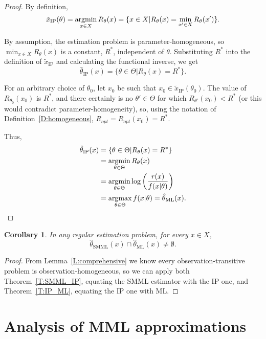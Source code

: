 \documentclass{IEEEtran}
\newcommand{\argmax}{\operatornamewithlimits{argmax}}
\newcommand{\argmin}{\operatornamewithlimits{argmin}}
\newtheorem{cor}{Corollary}[thm]
\begin{document}
\begin{proof}
By definition,
\[
\tilde{x}_{\text{IP}}(\theta)=\argmin_{x\in X} R_{\theta}(x)
=\{x\in X | R_{\theta}(x)=\min_{x'\in X} R_{\theta}(x')\}.
\]

By assumption, the estimation problem is parameter-homogeneous, so
$\min_{x\in X} R_{\theta}(x)$
is a constant, $R^*$, independent of $\theta$.
Substituting $R^*$ into the definition of $\tilde{x}_{\text{IP}}$ and
calculating the functional inverse, we get
\[
\hat{\theta}_{\text{IP}}(x)=\{\theta\in\Theta | R_{\theta}(x)=R^*\}.
\]

For an arbitrary choice of $\theta_0$,
let $x_0$ be such that $x_0\in \tilde{x}_{\text{IP}}(\theta_0)$.
The value of $R_{\theta_0}(x_0)$ is $R^*$, and there
certainly is no $\theta'\in\Theta$ for which
$R_{\theta'}(x_0)<R^*$ (or this would contradict parameter-homogeneity),
so, using the notation of Definition~\ref{D:homogeneous},
$R_{\textit{opt}}=R_{\textit{opt}}(x_0)=R^*$.

Thus,
\begin{align*}
\hat{\theta}_{\text{IP}}(x)&=\{\theta\in\Theta | R_{\theta}(x)=R^*\} \\
&=\argmin_{\theta\in\Theta} R_{\theta}(x) \\
&=\argmin_{\theta\in\Theta} \log\left(\frac{r(x)}{f(x|\theta)}\right) \\
&=\argmax_{\theta\in\Theta} f(x|\theta)
=\hat{\theta}_{\text{ML}}(x).
\end{align*}
\end{proof}

\begin{cor}\label{C:SMML_ML}
In any regular estimation problem, for every $x\in X$,
\[
\hat{\theta}_{\text{SMML}}(x) \cap \hat{\theta}_{\text{ML}}(x) \ne \emptyset.
\]
\end{cor}

\begin{proof}
From Lemma~\ref{L:comprehensive} we know every observation-transitive problem
is observation-homogeneous, so we can apply both Theorem~\ref{T:SMML_IP}, equating
the SMML estimator with the IP one, and Theorem~\ref{T:IP_ML}, equating the
IP one with ML.
\end{proof}

\appendices

\section{Analysis of MML approximations}\label{S:approximations}
\end{document}
